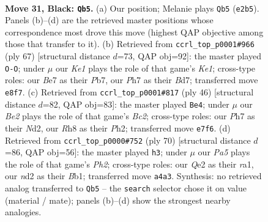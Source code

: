 \documentclass[11pt]{article}
\begin{document}
\clearpage

\begin{figure}[p]\centering
\begin{subfigure}{0.46\textwidth}\centering
\resizebox{\linewidth}{!}{%
\newchessgame
\chessboard[
  setfen={r3k2r/p3b1pp/8/n2p4/p2P3P/4P1PK/1BQNq3/2R5 b - - 5 31},
  showmover=false,
  pgfstyle=straightmove, color=movearrow, markmove={e2-b5}
]}
\caption{}
\end{subfigure}\hfill
\begin{subfigure}{0.46\textwidth}\centering
\resizebox{\linewidth}{!}{%
\newchessgame
\chessboard[
  setfen={4k2r/1p1b1pp1/7p/4p1n1/1N6/P4PP1/1P1QBq1P/3R3K b k - 3 34},
  showmover=false,
  pgfstyle=straightmove, color=movearrow, markmove={e8-g8}
]}
\caption{}
\end{subfigure}
\\[4pt]
\begin{subfigure}{0.46\textwidth}\centering
\resizebox{\linewidth}{!}{%
\newchessgame
\chessboard[
  setfen={4r1k1/5bpp/1Qn1q3/1p6/p2p1P2/2P5/PPBN2PP/2R3K1 w - - 0 24},
  showmover=false,
  pgfstyle=straightmove, color=movearrow, markmove={c2-e4}
]}
\caption{}
\end{subfigure}\hfill
\begin{subfigure}{0.46\textwidth}\centering
\resizebox{\linewidth}{!}{%
\newchessgame
\chessboard[
  setfen={6k1/5pbp/3q2p1/3n1PB1/2Q5/8/1P4PP/rB2R2K w - - 0 36},
  showmover=false,
  pgfstyle=straightmove, color=movearrow, markmove={h2-h3}
]}
\caption{}
\end{subfigure}
\caption{\textbf{Move 31, Black: \texttt{Qb5}.} (a) Our position; Melanie plays \texttt{Qb5} (\texttt{e2b5}). Panels (b)--(d) are the retrieved master positions whose correspondence most drove this move (highest QAP objective among those that transfer to it). (b) Retrieved from \texttt{ccrl\_top\_p0001\#966} (ply 67) [structural distance $d$=73, QAP obj=92]: the master played \texttt{O-O}; under $\mu$ our \emph{Ke1} plays the role of that game's \emph{Ke1}; cross-type roles: our \emph{B}e7 as their \emph{P}b7, our \emph{P}h7 as their \emph{B}d7; transferred move \texttt{e8f7}. (c) Retrieved from \texttt{ccrl\_top\_p0001\#817} (ply 46) [structural distance $d$=82, QAP obj=83]: the master played \texttt{Be4}; under $\mu$ our \emph{Be2} plays the role of that game's \emph{Bc2}; cross-type roles: our \emph{P}h7 as their \emph{N}d2, our \emph{R}h8 as their \emph{P}h2; transferred move \texttt{e7f6}. (d) Retrieved from \texttt{ccrl\_top\_p0000\#752} (ply 70) [structural distance $d$=86, QAP obj=56]: the master played \texttt{h3}; under $\mu$ our \emph{Pa5} plays the role of that game's \emph{Ph2}; cross-type roles: our \emph{Q}e2 as their \emph{r}a1, our \emph{n}d2 as their \emph{B}b1; transferred move \texttt{a4a3}. Synthesis: no retrieved analog transferred to \texttt{Qb5} -- the \texttt{search} selector chose it on value (material / mate); panels (b)--(d) show the strongest nearby analogies.}
\label{fig:thought-m61}
\end{figure}
\end{document}
